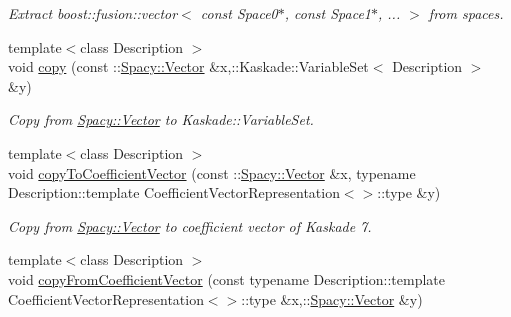 \begin{DoxyCompactItemize}
\begin{DoxyCompactList}\small\item\em Extract boost\+::fusion\+::vector$<$ const Space0$\ast$, const Space1$\ast$, ... $>$ from spaces. \end{DoxyCompactList}\item 
\hypertarget{namespaceSpacy_1_1Kaskade_afbbd7e385eda54f651c45b1c074d7bf9}{}{\footnotesize template$<$class Description $>$ }\\void \hyperlink{namespaceSpacy_1_1Kaskade_afbbd7e385eda54f651c45b1c074d7bf9}{copy} (const \+::\hyperlink{classSpacy_1_1Vector}{Spacy\+::\+Vector} \&x,\+::Kaskade\+::\+Variable\+Set$<$ Description $>$ \&y)\label{namespaceSpacy_1_1Kaskade_afbbd7e385eda54f651c45b1c074d7bf9}

\begin{DoxyCompactList}\small\item\em Copy from \hyperlink{classSpacy_1_1Vector}{Spacy\+::\+Vector} to Kaskade\+::\+Variable\+Set. \end{DoxyCompactList}\item 
\hypertarget{namespaceSpacy_1_1Kaskade_a4d7422b0c155f9622e54b9d3503d82d8}{}{\footnotesize template$<$class Description $>$ }\\void \hyperlink{namespaceSpacy_1_1Kaskade_a4d7422b0c155f9622e54b9d3503d82d8}{copy\+To\+Coefficient\+Vector} (const \+::\hyperlink{classSpacy_1_1Vector}{Spacy\+::\+Vector} \&x, typename Description\+::template Coefficient\+Vector\+Representation$<$$>$\+::type \&y)\label{namespaceSpacy_1_1Kaskade_a4d7422b0c155f9622e54b9d3503d82d8}

\begin{DoxyCompactList}\small\item\em Copy from \hyperlink{classSpacy_1_1Vector}{Spacy\+::\+Vector} to coefficient vector of Kaskade 7. \end{DoxyCompactList}\item 
\hypertarget{namespaceSpacy_1_1Kaskade_a75249db31f75e23a474c4a9a5b792d67}{}{\footnotesize template$<$class Description $>$ }\\void \hyperlink{namespaceSpacy_1_1Kaskade_a75249db31f75e23a474c4a9a5b792d67}{copy\+From\+Coefficient\+Vector} (const typename Description\+::template Coefficient\+Vector\+Representation$<$$>$\+::type \&x,\+::\hyperlink{classSpacy_1_1Vector}{Spacy\+::\+Vector} \&y)\label{namespaceSpacy_1_1Kaskade_a75249db31f75e23a474c4a9a5b792d67}


\end{DoxyCompactItemize}

